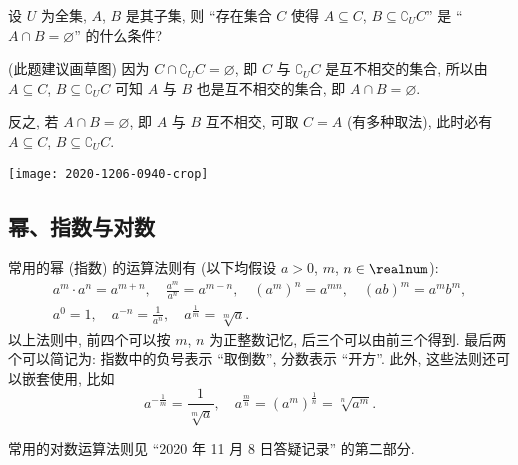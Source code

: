 \begin{example}
    设 $U$ 为全集, $A$, $B$ 是其子集, 则 ``存在集合 $C$ 使得 $A\subseteq C$, $B\subseteq \complement_U C$'' 是 ``$A\cap B=\varnothing$'' 的什么条件?
\end{example}
\begin{solution}
    (此题建议画草图) 因为 $C\cap \complement_U C= \varnothing$, 即 $C$ 与 $\complement_U C$ 是互不相交的集合, 所以由 $A\subseteq C$, $B\subseteq \complement_U C$ 可知 $A$ 与 $B$ 也是互不相交的集合, 即 $A\cap B=\varnothing$.
    
    反之, 若 $A\cap B=\varnothing$, 即 $A$ 与 $B$ 互不相交, 可取 $C=A$ (有多种取法), 此时必有 $A\subseteq C$, $B\subseteq \complement_U C$.
    
    \begin{center}
        \texttt{[image: 2020-1206-0940-crop]}
    \end{center}
\end{solution}

\subsection{幂、指数与对数}

常用的幂 (指数) 的运算法则有 (以下均假设 $a>0$, $m$, $n\in\realnum$):
\[\begin{gathered}
    a^m\cdot a^n= a^{m+n},\quad \frac{a^m}{a^n}= a^{m-n},\quad 
        (a^m)^n= a^{mn},\quad (ab)^m= a^mb^m,\\
    a^0= 1,\quad a^{-n}= \frac1{a^n},\quad a^{\frac1m}=\sqrt[m]{a}.
    \end{gathered}\]
以上法则中, 前四个可以按 $m$, $n$ 为正整数记忆, 后三个可以由前三个得到. 最后两个可以简记为: 指数中的负号表示 ``取倒数'', 分数表示 ``开方''. 此外, 这些法则还可以嵌套使用, 比如
\[a^{-\frac1m}= \frac1{\sqrt[m]{a}},\quad
    a^{\frac{m}n}= (a^m)^\frac1n= \sqrt[n]{a^m}.\]
    
常用的对数运算法则见 ``2020 年 11 月 8 日答疑记录'' 的第二部分.

